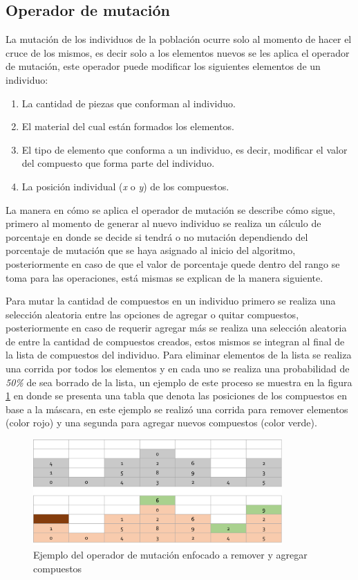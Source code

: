 \subsection{Operador de mutación}
\label{subsection:mutation_operator}

La mutación de los individuos de la población ocurre solo al momento de hacer el
cruce de los mismos, es decir solo a los elementos nuevos se les aplica el
operador de mutación, este operador puede modificar los siguientes elementos de
un individuo:
\begin{enumerate}
  \item La cantidad de piezas que conforman al individuo.
  \item El material del cual están formados los elementos.
  \item El tipo de elemento que conforma a un individuo, es decir, modificar el
  valor del compuesto que forma parte del individuo.
  \item La posición individual (\textit{x} o \textit{y}) de los compuestos.
\end{enumerate}

La manera en cómo se aplica el operador de mutación se describe cómo sigue,
primero al momento de generar al nuevo individuo se realiza un cálculo de
porcentaje en donde se decide si tendrá o no mutación dependiendo del porcentaje
de mutación que se haya asignado al inicio del algoritmo, posteriormente en caso
de que el valor de porcentaje quede dentro del rango se toma para las
operaciones, está mismas se explican de la manera siguiente.

Para mutar la cantidad de compuestos en un individuo primero se realiza una
selección aleatoria entre las opciones de agregar o quitar compuestos,
posteriormente en caso de requerir agregar más se realiza una selección
aleatoria de entre la cantidad de compuestos creados, estos mismos se integran
al final de la lista de compuestos del individuo. Para eliminar elementos de la
lista se realiza una corrida por todos los elementos y en cada uno se realiza
una probabilidad de \textit{50\%} de sea borrado de la lista, un ejemplo de este
proceso se muestra en la figura \ref{figure:mutate_add_remove} en donde se
presenta una tabla que denota las posiciones de los compuestos en base a la
máscara, en este ejemplo se realizó una corrida para remover elementos (color
rojo) y una segunda para agregar nuevos compuestos (color verde).

\begin{figure}
  \centering
  \includegraphics[width=0.85\textwidth]{img/mutation_add_remove.png}
  \caption{Ejemplo del operador de mutación enfocado a remover y agregar compuestos}
  \label{figure:mutate_add_remove}
\end{figure}

